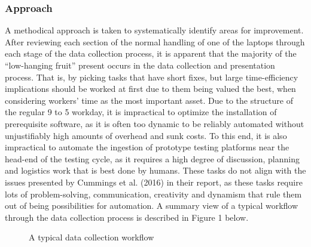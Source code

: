 \documentclass[12pt]{article}
\begin{document}
\subsubsection{Approach}
\indent\hspace{0.5in} A methodical approach is taken to systematically identify areas for improvement. After reviewing each section of the normal handling of one of the laptops through each stage of the data collection process, it is apparent that the majority of the “low-hanging fruit” present occurs in the data collection and presentation process. That is, by picking tasks that have short fixes, but large time-efficiency implications should be worked at first due to them being valued the best, when considering workers' time as the most important asset. Due to the structure of the regular 9 to 5 workday, it is impractical to optimize the installation of prerequisite software, as it is often too dynamic to be reliably automated without unjustifiably high amounts of overhead and sunk costs. To this end, it is also impractical to automate the ingestion of prototype testing platforms near the head-end of the testing cycle, as it requires a high degree of discussion, planning and logistics work that is best done by humans. These tasks do not align with the issues presented by Cummings et al. (2016) in their report, as these tasks require lots of problem-solving, communication, creativity and dynamism that rule them out of being possibilities for automation. A summary view of a typical workflow through the data collection process is described in Figure 1 below.

\begin{figure}[h!]
\begin{center}
\end{center}
\caption{A typical data collection workflow}
\end{figure}
\newpage
\end{document}
